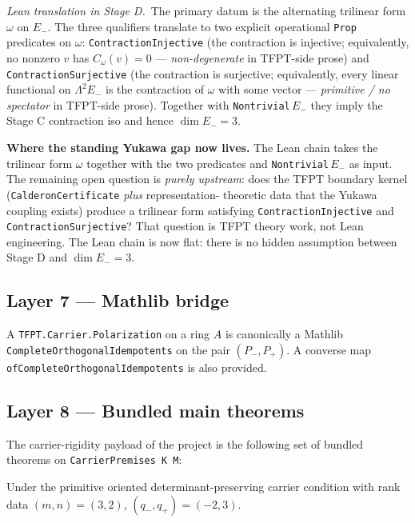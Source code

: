 \noindent
\emph{Lean translation in Stage D.}\ The primary datum is the
alternating trilinear form $\omega$ on $E_-$. The three
qualifiers translate to two explicit operational \texttt{Prop}
predicates on $\omega$:
\texttt{ContractionInjective} (the contraction is injective;
equivalently, no nonzero $v$ has $C_\omega(v) = 0$ ---
\emph{non-degenerate} in TFPT-side prose) and
\texttt{ContractionSurjective} (the contraction is surjective;
equivalently, every linear functional on $\Lambda^2 E_-$ is the
contraction of $\omega$ with some vector --- \emph{primitive /
no spectator} in TFPT-side prose). Together with
\texttt{Nontrivial}\,$E_-$ they imply the Stage C contraction
iso and hence $\dim E_- = 3$.

\textbf{Where the standing Yukawa gap now lives.}
The Lean chain takes the trilinear form $\omega$ together with
the two predicates and \texttt{Nontrivial}\,$E_-$ as input.
The remaining open question is \emph{purely upstream}: does the
TFPT boundary kernel
(\texttt{CalderonCertificate} \emph{plus} representation-
theoretic data that the Yukawa coupling exists) produce a
trilinear form satisfying \texttt{ContractionInjective} and
\texttt{ContractionSurjective}? That question is TFPT theory
work, not Lean engineering. The Lean chain is now flat: there is
no hidden assumption between Stage D and $\dim E_- = 3$.

\subsection*{Layer 7 --- Mathlib bridge}

\begin{theorem}
A \texttt{TFPT.Carrier.Polarization} on a ring $A$ is canonically
a Mathlib \texttt{CompleteOrthogonalIdempotents} on the pair
$(P_-, P_+)$. A converse map
\texttt{ofCompleteOrthogonalIdempotents} is also provided.
\end{theorem}

\subsection*{Layer 8 --- Bundled main theorems}

The carrier-rigidity payload of the project is the following set
of bundled theorems on
\texttt{CarrierPremises K M}:

\begin{theorem}
Under the primitive oriented determinant-preserving carrier
condition with rank data $(m, n) = (3, 2)$, $(q_-, q_+) = (-2, 3)$.
\end{theorem}

